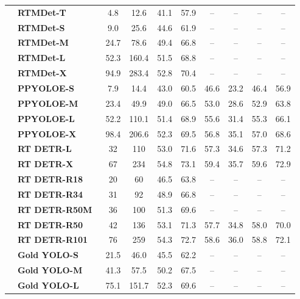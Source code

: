\documentclass[10pt,twocolumn,letterpaper]{article}
\begin{document}
\begin{table}[h]
\begin{threeparttable}[t]
\begin{tabular}{l|lcccccccc}
				\multirow{19}{*}{\rotatebox{90}{\textbf{ImageNet Pretrained}}} & \textbf{RTMDet-T~\cite{lyu2022rtmdet}} & 4.8 & 12.6 & 41.1 & 57.9 & -- & -- & -- & -- \\
				& \textbf{RTMDet-S~\cite{lyu2022rtmdet}} & 9.0 & 25.6 & 44.6 & 61.9 & -- & -- & -- & -- \\
				& \textbf{RTMDet-M~\cite{lyu2022rtmdet}} & 24.7 & 78.6 & 49.4 & 66.8 & -- & -- & -- & -- \\
				& \textbf{RTMDet-L~\cite{lyu2022rtmdet}} & 52.3 & 160.4 & 51.5 & 68.8 & -- & -- & -- & -- \\
				& \textbf{RTMDet-X~\cite{lyu2022rtmdet}} & 94.9 & 283.4 & 52.8 & 70.4 & -- & -- & -- & -- \\
				\cline{2-10}
				& \textbf{PPYOLOE-S~\cite{xu2022pp}} & 7.9 & 14.4 & 43.0 & 60.5 & 46.6 & 23.2 & 46.4 & 56.9 \\
				& \textbf{PPYOLOE-M~\cite{xu2022pp}} & 23.4 & 49.9 & 49.0 & 66.5 & 53.0 & 28.6 & 52.9 & 63.8 \\
				& \textbf{PPYOLOE-L~\cite{xu2022pp}} & 52.2 & 110.1 & 51.4 & 68.9 & 55.6 & 31.4 & 55.3 & 66.1 \\
				& \textbf{PPYOLOE-X~\cite{xu2022pp}} & 98.4 & 206.6 & 52.3 & 69.5 & 56.8 & 35.1 & 57.0 & 68.6 \\
				\cline{2-10}
				& \textbf{RT DETR-L~\cite{lv2023detrs}} & 32 & 110 & 53.0 & 71.6 & 57.3 & 34.6 & 57.3 & 71.2 \\
				& \textbf{RT DETR-X~\cite{lv2023detrs}} & 67 & 234 & 54.8 & 73.1 & 59.4 & 35.7 & 59.6 & 72.9 \\
				& \textbf{RT DETR-R18~\cite{lv2023detrs}} & 20 & 60 & 46.5 & 63.8 & -- & -- & -- & -- \\
				& \textbf{RT DETR-R34~\cite{lv2023detrs}} & 31 & 92 & 48.9 & 66.8 & -- & -- & -- & -- \\
				& \textbf{RT DETR-R50M~\cite{lv2023detrs}} & 36 & 100 & 51.3 & 69.6 & -- & -- & -- & -- \\
				& \textbf{RT DETR-R50~\cite{lv2023detrs}} & 42 & 136 & 53.1 & 71.3 & 57.7 & 34.8 & 58.0 & 70.0 \\
				& \textbf{RT DETR-R101~\cite{lv2023detrs}} & 76 & 259 & 54.3 & 72.7 & 58.6 & 36.0 & 58.8 & 72.1 \\
				\cline{2-10}
				& \textbf{Gold YOLO-S~\cite{wang2023gold}} & 21.5 & 46.0 & 45.5 & 62.2 & -- & -- & -- & -- \\
				& \textbf{Gold YOLO-M~\cite{wang2023gold}} & 41.3 & 57.5 & 50.2 & 67.5 & -- & -- & -- & -- \\
				& \textbf{Gold YOLO-L~\cite{wang2023gold}} & 75.1 & 151.7 & 52.3 & 69.6 & -- & -- & -- & -- \\

\end{tabular}
\end{threeparttable}
\end{table}
\end{document}
